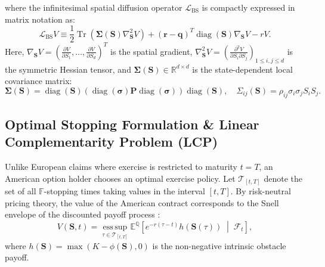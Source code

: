 \documentclass[11pt,a4paper]{article}
\begin{document}
where the infinitesimal spatial diffusion operator $\mathcal{L}_{\text{BS}}$ is compactly expressed in matrix notation as:
\begin{equation}
\label{eq:bs_operator_matrix}
\mathcal{L}_{\text{BS}} V \equiv \frac{1}{2} \operatorname{Tr}\left( \boldsymbol{\Sigma}(\mathbf{S}) \nabla^2_{\mathbf{S}} V \right) + (\mathbf{r} - \mathbf{q})^T \operatorname{diag}(\mathbf{S}) \nabla_{\mathbf{S}} V - r V.
\end{equation}
Here, $\nabla_{\mathbf{S}} V = \left( \frac{\partial V}{\partial S_1}, \dots, \frac{\partial V}{\partial S_d} \right)^T$ is the spatial gradient, $\nabla^2_{\mathbf{S}} V = \left( \frac{\partial^2 V}{\partial S_i \partial S_j} \right)_{1 \le i, j \le d}$ is the symmetric Hessian tensor, and $\boldsymbol{\Sigma}(\mathbf{S}) \in \mathbb{R}^{d \times d}$ is the state-dependent local covariance matrix:
\begin{equation}
\label{eq:sigma_matrix_def}
\boldsymbol{\Sigma}(\mathbf{S}) = \operatorname{diag}(\mathbf{S}) \left( \operatorname{diag}(\boldsymbol{\sigma}) \mathbf{P} \operatorname{diag}(\boldsymbol{\sigma}) \right) \operatorname{diag}(\mathbf{S}), \quad \Sigma_{ij}(\mathbf{S}) = \rho_{ij} \sigma_i \sigma_j S_i S_j.
\end{equation}

\subsection{Optimal Stopping Formulation \& Linear Complementarity Problem (LCP)}
Unlike European claims where exercise is restricted to maturity $t=T$, an American option holder chooses an optimal exercise policy. Let $\mathcal{T}_{[t, T]}$ denote the set of all $\mathbb{F}$-stopping times taking values in the interval $[t, T]$. By risk-neutral pricing theory, the value of the American contract corresponds to the Snell envelope of the discounted payoff process \cite{jaillet1990variational, karatzas1998methods}:
\begin{equation}
\label{eq:snell_envelope}
V(\mathbf{S}, t) = \operatorname*{ess\,sup}_{\tau \in \mathcal{T}_{[t, T]}} \mathbb{E}^\mathbb{Q}\left[ e^{-r(\tau - t)} h(\mathbf{S}(\tau)) \;\middle|\; \mathcal{F}_t \right],
\end{equation}
where $h(\mathbf{S}) = \max\left(K - \phi(\mathbf{S}), 0\right)$ is the non-negative intrinsic obstacle payoff.
\end{document}
